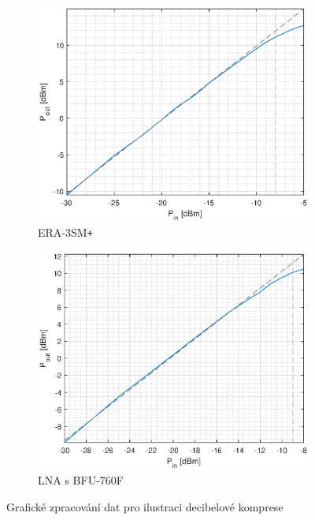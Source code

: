 \documentclass[11pt,a4paper]{article}
\newcommand{\plus}{{\texttt{+}}}
\begin{document}
\begin{figure}[!ht]
\begin{subfigure}{0.5\textwidth}
    \centering
    \includegraphics[width=\textwidth]{src/ERA3SM-compression.eps}
    \caption{ERA-3SM\plus}
    \label{fig:ERA3SM-compression}
\end{subfigure}%
\begin{subfigure}{0.5\textwidth}
    \centering
    \includegraphics[width=\textwidth]{src/BFU760F-compression.eps}
    \caption{LNA s BFU-760F}
    \label{fig:BFU760F-compression}
\end{subfigure}
\caption{Grafické zpracování dat pro ilustraci decibelové komprese}
\end{figure}
\end{document}
